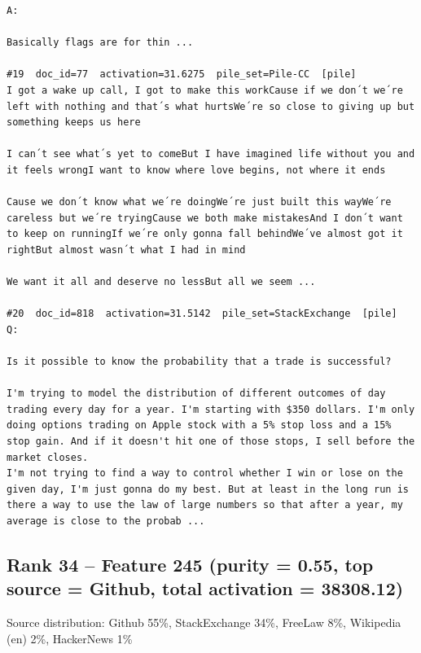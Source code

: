 \begin{verbatim}
A:

Basically flags are for thin ...

#19  doc_id=77  activation=31.6275  pile_set=Pile-CC  [pile]
I got a wake up call, I got to make this workCause if we don´t we´re left with nothing and that´s what hurtsWe´re so close to giving up but something keeps us here

I can´t see what´s yet to comeBut I have imagined life without you and it feels wrongI want to know where love begins, not where it ends

Cause we don´t know what we´re doingWe´re just built this wayWe´re careless but we´re tryingCause we both make mistakesAnd I don´t want to keep on runningIf we´re only gonna fall behindWe´ve almost got it rightBut almost wasn´t what I had in mind

We want it all and deserve no lessBut all we seem ...

#20  doc_id=818  activation=31.5142  pile_set=StackExchange  [pile]
Q:

Is it possible to know the probability that a trade is successful?

I'm trying to model the distribution of different outcomes of day trading every day for a year. I'm starting with $350 dollars. I'm only doing options trading on Apple stock with a 5% stop loss and a 15% stop gain. And if it doesn't hit one of those stops, I sell before the market closes.
I'm not trying to find a way to control whether I win or lose on the given day, I'm just gonna do my best. But at least in the long run is there a way to use the law of large numbers so that after a year, my average is close to the probab ...

\end{verbatim}

\subsection*{Rank 34 -- Feature 245 (purity = 0.55, top source = Github, total activation = 38308.12)}

Source distribution: Github 55\%, StackExchange 34\%, FreeLaw 8\%, Wikipedia (en) 2\%, HackerNews 1\%


